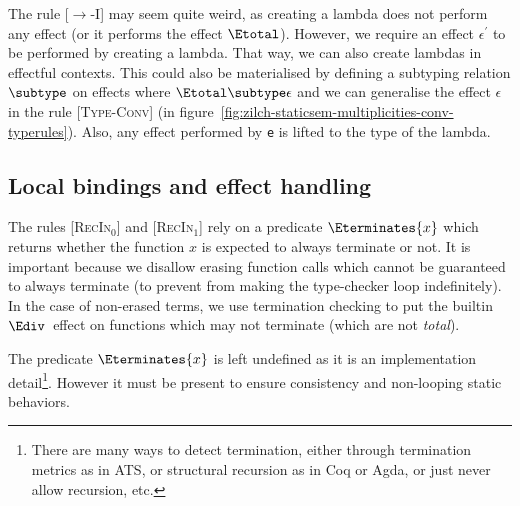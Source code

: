 The rule \textsc{[$\rightarrow$-I]} may seem quite weird, as creating a lambda does not perform any effect (or it performs the effect $\Etotal$).
However, we require an effect $\epsilon^\prime$ to be performed by creating a lambda.
That way, we can also create lambdas in effectful contexts.
This could also be materialised by defining a subtyping relation $\subtype$ on effects where $\Etotal \subtype \epsilon$ and we can generalise the effect $\epsilon$ in the rule \textsc{[Type-Conv]} (in figure~\ref{fig:zilch-staticsem-multiplicities-conv-typerules}).
Also, any effect performed by \texttt{e} is lifted to the type of the lambda.

\subsection{Local bindings and effect handling}\label{subsec:zilch-staticsem-exprs-local}

The rules \textsc{[RecIn$_0$]} and \textsc{[RecIn$_1$]} rely on a predicate $\Eterminates{x}$ which returns whether the function $x$ is expected to always terminate or not.
It is important because we disallow erasing function calls which cannot be guaranteed to always terminate (to prevent from making the type-checker loop indefinitely).
In the case of non-erased terms, we use termination checking to put the builtin $\Ediv$\ effect on functions which may not terminate (which are not \textit{total}).

The predicate $\Eterminates{x}$ is left undefined as it is an implementation detail\footnote{There are many ways to detect termination, either through termination metrics as in ATS, or structural recursion as in Coq or Agda, or just never allow recursion, etc.}.
However it must be present to ensure consistency and non-looping static behaviors.


